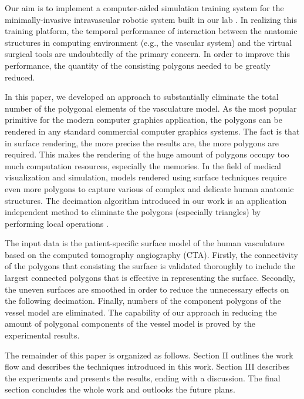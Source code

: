 Our aim is to implement a computer-aided simulation training system for the minimally-invasive intravascular robotic system built in our lab \cite{Ji2011EMBC}.
In realizing this training platform, the temporal performance of interaction between the anatomic structures in computing environment (e.g., the vascular system) and the virtual surgical tools are undoubtedly of the primary concern. %
In order to improve this performance, the quantity of the consisting polygons needed to be greatly reduced.

In this paper, we developed an approach to substantially eliminate the total number of the polygonal elements of the vasculature model.
As the most popular primitive for the modern computer graphics application, the polygons can be rendered in any standard commercial computer graphics systems.
The fact is that in surface rendering, the more precise the results are, the more polygons are required.
This makes the rendering of the huge amount of polygons occupy too much computation resources, especially the memories.
In the field of medical visualization and simulation, models rendered using surface techniques require even more polygons to capture various of complex and delicate human anatomic structures. %
The decimation algorithm introduced in our work is an application independent method to eliminate the polygons (especially triangles) by performing local operations \cite{Schroeder1992}. %

The input data is the patient-specific surface model of the human vasculature based on the computed tomography angiography (CTA).
Firstly, the connectivity of the polygons that consisting the surface is validated thoroughly to include the largest connected polygons that is effective in representing the surface. %
Secondly, the uneven surfaces are smoothed in order to reduce the unnecessary effects on the following decimation.
Finally, numbers of the component polygons of the vessel model are eliminated.
The capability of our approach in reducing the amount of polygonal components of the vessel model is proved by the experimental results.

The remainder of this paper is organized as follows.
Section II outlines the work flow and describes the techniques introduced in this work.
Section III describes the experiments and presents the results, ending with a discussion.
The final section concludes the whole work and outlooks the future plans. 